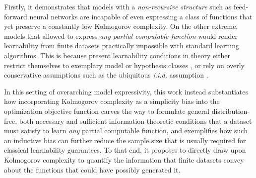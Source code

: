 Firstly, it demonstrates that models with a \textit{non-recursive structure} such as feed-forward neural networks are incapable of even expressing a class of functions that yet preserve a constantly low Kolmogorov complexity.
On the other extreme, models that allowed to express \textit{any partial computable function} would render learnability from finite datasets practically impossible with standard learning algorithms.
This is because present learnability conditions in theory either restrict themselves to exemplary model or hypothesis classes \cite{ahuja2021invariance,arjovsky2019invariant}, or rely on overly conservative assumptions such as the ubiquitous \textit{i.i.d.} assumption \cite{paccagnan2024pick,campi2023compression}.

In this setting of overarching model expressivity, this work instead substantiates how incorporating Kolmogorov complexity as a simplicity bias into the optimization objective function carves the way to formulate general distribution-free, both necessary and sufficient information-theoretic conditions that a dataset must satisfy to learn \textit{any} partial computable function, and exemplifies how such an inductive bias can further reduce the sample size that is usually required for classical learnability guarantees.
To that end, it proposes to directly draw upon Kolmogorov complexity to quantify the information that finite datasets convey about the functions that could have possibly generated it.

